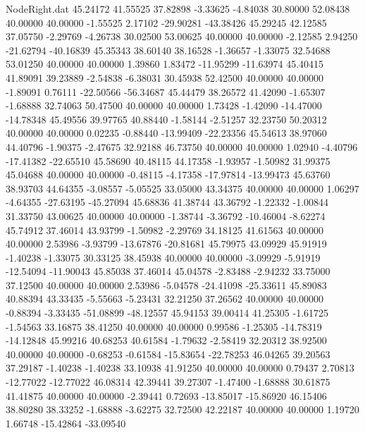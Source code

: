 \begin{filecontents}{NodeRight.dat}
  45.24172   41.55525   37.82898    -3.33625   -4.84038   30.80000   52.08438   40.00000   40.00000   -1.55525    2.17102  -29.90281  -43.38426
  45.29245   42.12585   37.05750    -2.29769   -4.26738   30.02500   53.00625   40.00000   40.00000   -2.12585    2.94250  -21.62794  -40.16839
  45.35343   38.60140   38.16528    -1.36657   -1.33075   32.54688   53.01250   40.00000   40.00000    1.39860    1.83472  -11.95299  -11.63974
  45.40415   41.89091   39.23889    -2.54838   -6.38031   30.45938   52.42500   40.00000   40.00000   -1.89091    0.76111  -22.50566  -56.34687
  45.44479   38.26572   41.42090    -1.65307   -1.68888   32.74063   50.47500   40.00000   40.00000    1.73428   -1.42090  -14.47000  -14.78348
  45.49556   39.97765   40.88440    -1.58144   -2.51257   32.23750   50.20312   40.00000   40.00000    0.02235   -0.88440  -13.99409  -22.23356
  45.54613   38.97060   44.40796    -1.90375   -2.47675   32.92188   46.73750   40.00000   40.00000    1.02940   -4.40796  -17.41382  -22.65510
  45.58690   40.48115   44.17358    -1.93957   -1.50982   31.99375   45.04688   40.00000   40.00000   -0.48115   -4.17358  -17.97814  -13.99473
  45.63760   38.93703   44.64355    -3.08557   -5.05525   33.05000   43.34375   40.00000   40.00000    1.06297   -4.64355  -27.63195  -45.27094
  45.68836   41.38744   43.36792    -1.22332   -1.00844   31.33750   43.00625   40.00000   40.00000   -1.38744   -3.36792  -10.46004   -8.62274
  45.74912   37.46014   43.93799    -1.50982   -2.29769   34.18125   41.61563   40.00000   40.00000    2.53986   -3.93799  -13.67876  -20.81681
  45.79975   43.09929   45.91919    -1.40238   -1.33075   30.33125   38.45938   40.00000   40.00000   -3.09929   -5.91919  -12.54094  -11.90043
  45.85038   37.46014   45.04578    -2.83488   -2.94232   33.75000   37.12500   40.00000   40.00000    2.53986   -5.04578  -24.41098  -25.33611
  45.89083   40.88394   43.33435    -5.55663   -5.23431   32.21250   37.26562   40.00000   40.00000   -0.88394   -3.33435  -51.08899  -48.12557
  45.94153   39.00414   41.25305    -1.61725   -1.54563   33.16875   38.41250   40.00000   40.00000    0.99586   -1.25305  -14.78319  -14.12848
  45.99216   40.68253   40.61584    -1.79632   -2.58419   32.20312   38.92500   40.00000   40.00000   -0.68253   -0.61584  -15.83654  -22.78253
  46.04265   39.20563   37.29187    -1.40238   -1.40238   33.10938   41.91250   40.00000   40.00000    0.79437    2.70813  -12.77022  -12.77022
  46.08314   42.39441   39.27307    -1.47400   -1.68888   30.61875   41.41875   40.00000   40.00000   -2.39441    0.72693  -13.85017  -15.86920
  46.15406   38.80280   38.33252    -1.68888   -3.62275   32.72500   42.22187   40.00000   40.00000    1.19720    1.66748  -15.42864  -33.09540

\end{filecontents}
